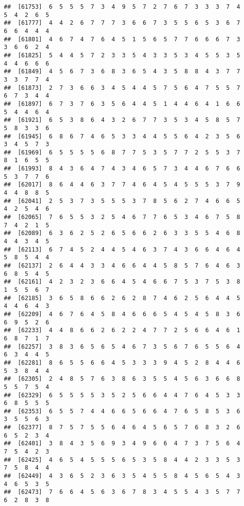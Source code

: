 \documentclass[
]{book}
\begin{document}
\begin{verbatim}
##  [61753]  6  5  5  5  7  3  4  9  5  7  2  7  6  7  3  3  3  7  4  5  4  2  6  5
##  [61777]  4  4  2  6  7  7  7  3  6  6  7  3  5  5  6  5  3  6  7  6  6  4  4  4
##  [61801]  4  6  7  4  7  6  4  5  1  5  6  5  7  7  6  6  6  7  3  3  6  6  2  4
##  [61825]  5  4  4  5  7  2  3  3  5  4  3  3  5  3  4  5  5  3  5  4  4  6  6  6
##  [61849]  4  5  6  7  3  6  8  3  6  5  4  3  5  8  8  4  3  7  7  3  3  7  7  4
##  [61873]  2  7  3  6  6  3  4  5  4  4  5  7  5  6  4  7  5  5  7  6  7  3  4  4
##  [61897]  6  7  3  7  6  3  5  6  4  4  5  1  4  4  6  4  1  6  6  5  4  4  6  4
##  [61921]  6  5  3  8  6  4  3  2  6  7  7  3  5  3  4  5  8  5  7  5  8  3  3  6
##  [61945]  6  8  6  7  4  6  5  3  3  4  4  5  5  6  4  2  3  5  6  3  4  5  7  3
##  [61969]  6  5  5  5  5  6  8  7  7  5  3  5  7  7  2  5  5  3  7  8  1  6  5  5
##  [61993]  8  4  3  6  4  7  4  3  4  6  5  7  3  4  4  6  7  6  6  5  3  7  7  6
##  [62017]  8  6  4  4  6  3  7  7  4  6  4  5  4  5  5  5  3  7  9  4  4  8  8  5
##  [62041]  2  5  3  7  3  5  5  5  3  7  8  5  6  2  7  4  6  6  5  4  2  5  4  6
##  [62065]  7  6  5  5  3  2  5  4  6  7  7  6  5  3  4  6  7  5  8  7  4  2  1  5
##  [62089]  6  3  6  2  5  2  6  5  6  6  2  6  3  3  5  5  4  6  8  4  4  3  4  5
##  [62113]  6  7  4  5  2  4  4  5  4  6  3  7  4  3  6  6  4  6  4  5  8  5  4  4
##  [62137]  2  6  4  4  3  3  4  6  6  4  4  5  8  5  7  6  4  6  3  6  8  5  4  5
##  [62161]  4  2  3  2  3  6  6  4  5  4  6  6  7  5  3  7  5  3  8  1  5  5  6  7
##  [62185]  3  6  5  8  6  6  2  6  2  8  7  4  6  2  5  6  4  4  5  4  4  6  4  3
##  [62209]  4  6  7  6  4  5  8  4  6  6  6  5  4  5  4  5  8  3  6  6  9  5  2  6
##  [62233]  4  4  8  6  6  2  6  2  2  4  7  7  2  5  6  6  4  6  1  6  8  7  1  7
##  [62257]  3  8  3  6  5  6  5  4  6  7  3  5  6  7  6  5  5  6  4  6  3  4  4  5
##  [62281]  8  6  5  5  6  6  4  5  3  3  3  9  4  5  2  8  4  4  6  5  3  8  4  4
##  [62305]  2  4  8  5  7  6  3  8  6  3  5  5  4  5  6  3  6  6  8  5  5  7  5  4
##  [62329]  6  5  5  5  5  3  5  2  5  6  6  4  4  7  6  4  5  3  3  6  8  5  5  5
##  [62353]  6  5  5  7  4  4  6  6  5  6  6  4  7  6  5  8  5  3  6  3  5  5  6  3
##  [62377]  8  7  5  7  5  5  6  4  6  4  5  6  5  7  6  8  3  2  6  6  5  2  3  4
##  [62401]  3  8  4  3  5  6  9  3  4  9  6  6  4  7  3  7  5  6  4  7  5  4  2  3
##  [62425]  4  6  5  4  5  5  5  6  5  3  5  8  4  4  2  3  3  5  3  7  5  8  4  4
##  [62449]  4  3  6  5  2  3  6  3  5  4  5  5  8  4  5  6  5  4  3  4  6  5  3  5
##  [62473]  7  6  6  4  5  6  3  6  7  8  3  4  5  5  4  3  5  7  7  6  2  8  3  8

\end{verbatim}
\end{document}
